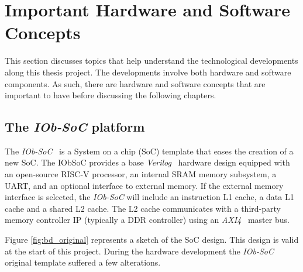 
\section{Important Hardware and Software Concepts}
\label{sec:must_have_concepts}

This section discusses topics that help understand the technological developments along this thesis project. The developments involve both hardware and software components. As such, there are hardware and software concepts that are important to have before discussing the following chapters.

\subsection{The \textit{IOb-SoC} platform}

The \textit{IOb-SoC}~\cite{iob_soc} is a System on a chip (SoC) template that eases the creation of a new SoC. The IObSoC provides a base \textit{Verilog}~\cite{thomas2008verilog} hardware design equipped with an open-source RISC-V processor, an internal SRAM memory subsystem, a UART, and an optional interface to external memory. If the external memory interface is selected, the \textit{IOb-SoC} will include an instruction L1 cache, a data L1 cache and a shared L2 cache. The L2 cache communicates with a third-party memory controller IP (typically a DDR controller) using an \textit{AXI4}~\cite{tidala2018high} master bus.

Figure \ref{fig:bd_original} represents a sketch of the SoC design. This design is valid at the start of this project. During the hardware development the \textit{IOb-SoC} original template suffered a few alterations.

